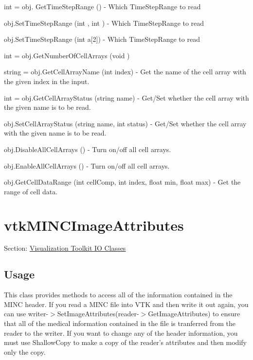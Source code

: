 \begin{DoxyItemize}
\item {\ttfamily int = obj. Get\-Time\-Step\-Range ()} -\/ Which Time\-Step\-Range to read  
\item {\ttfamily obj.\-Set\-Time\-Step\-Range (int , int )} -\/ Which Time\-Step\-Range to read  
\item {\ttfamily obj.\-Set\-Time\-Step\-Range (int a\mbox{[}2\mbox{]})} -\/ Which Time\-Step\-Range to read  
\item {\ttfamily int = obj.\-Get\-Number\-Of\-Cell\-Arrays (void )}  
\item {\ttfamily string = obj.\-Get\-Cell\-Array\-Name (int index)} -\/ Get the name of the cell array with the given index in the input.  
\item {\ttfamily int = obj.\-Get\-Cell\-Array\-Status (string name)} -\/ Get/\-Set whether the cell array with the given name is to be read.  
\item {\ttfamily obj.\-Set\-Cell\-Array\-Status (string name, int status)} -\/ Get/\-Set whether the cell array with the given name is to be read.  
\item {\ttfamily obj.\-Disable\-All\-Cell\-Arrays ()} -\/ Turn on/off all cell arrays.  
\item {\ttfamily obj.\-Enable\-All\-Cell\-Arrays ()} -\/ Turn on/off all cell arrays.  
\item {\ttfamily obj.\-Get\-Cell\-Data\-Range (int cell\-Comp, int index, float min, float max)} -\/ Get the range of cell data.  
\end{DoxyItemize}\hypertarget{vtkio_vtkmincimageattributes}{}\section{vtk\-M\-I\-N\-C\-Image\-Attributes}\label{vtkio_vtkmincimageattributes}
Section\-: \hyperlink{sec_vtkio}{Visualization Toolkit I\-O Classes} \hypertarget{vtkwidgets_vtkxyplotwidget_Usage}{}\subsection{Usage}\label{vtkwidgets_vtkxyplotwidget_Usage}
This class provides methods to access all of the information contained in the M\-I\-N\-C header. If you read a M\-I\-N\-C file into V\-T\-K and then write it out again, you can use writer-\/$>$Set\-Image\-Attributes(reader-\/$>$Get\-Image\-Attributes) to ensure that all of the medical information contained in the file is tranferred from the reader to the writer. If you want to change any of the header information, you must use Shallow\-Copy to make a copy of the reader's attributes and then modify only the copy.

